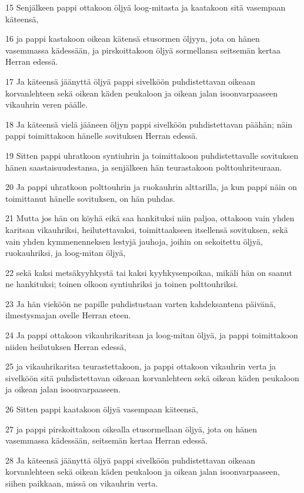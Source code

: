 \par 15 Senjälkeen pappi ottakoon öljyä loog-mitasta ja kaatakoon sitä vasempaan käteensä,
\par 16 ja pappi kastakoon oikean kätensä etusormen öljyyn, jota on hänen vasemmassa kädessään, ja pirskoittakoon öljyä sormellansa seitsemän kertaa Herran edessä.
\par 17 Ja käteensä jäänyttä öljyä pappi sivelköön puhdistettavan oikeaan korvanlehteen sekä oikean käden peukaloon ja oikean jalan isoonvarpaaseen vikauhrin veren päälle.
\par 18 Ja käteensä vielä jääneen öljyn pappi sivelköön puhdistettavan päähän; näin pappi toimittakoon hänelle sovituksen Herran edessä.
\par 19 Sitten pappi uhratkoon syntiuhrin ja toimittakoon puhdistettavalle sovituksen hänen saastaisuudestansa, ja senjälkeen hän teurastakoon polttouhriteuraan.
\par 20 Ja pappi uhratkoon polttouhrin ja ruokauhrin alttarilla, ja kun pappi näin on toimittanut hänelle sovituksen, on hän puhdas.
\par 21 Mutta jos hän on köyhä eikä saa hankituksi niin paljoa, ottakoon vain yhden karitsan vikauhriksi, heilutettavaksi, toimittaakseen itsellensä sovituksen, sekä vain yhden kymmenenneksen lestyjä jauhoja, joihin on sekoitettu öljyä, ruokauhriksi, ja loog-mitan öljyä,
\par 22 sekä kaksi metsäkyyhkystä tai kaksi kyyhkysenpoikaa, mikäli hän on saanut ne hankituksi; toinen olkoon syntiuhriksi ja toinen polttouhriksi.
\par 23 Ja hän vieköön ne papille puhdistustaan varten kahdeksantena päivänä, ilmestysmajan ovelle Herran eteen.
\par 24 Ja pappi ottakoon vikauhrikaritsan ja loog-mitan öljyä, ja pappi toimittakoon niiden heilutuksen Herran edessä,
\par 25 ja vikauhrikaritsa teurastettakoon, ja pappi ottakoon vikauhrin verta ja sivelköön sitä puhdistettavan oikeaan korvanlehteen sekä oikean käden peukaloon ja oikean jalan isoonvarpaaseen.
\par 26 Sitten pappi kaatakoon öljyä vasempaan käteensä,
\par 27 ja pappi pirskoittakoon oikealla etusormellaan öljyä, jota on hänen vasemmassa kädessään, seitsemän kertaa Herran edessä.
\par 28 Ja käteensä jäänyttä öljyä pappi sivelköön puhdistettavan oikeaan korvanlehteen sekä oikean käden peukaloon ja oikean jalan isoonvarpaaseen, siihen paikkaan, missä on vikauhrin verta.
